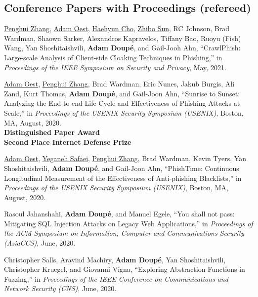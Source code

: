 \documentclass[11pt,letterpaper,sans]{moderncv}
\begin{document}
\subsection{Conference Papers with Proceedings (refereed)}

\begin{etaremune}

\item \underline{Penghui Zhang}, \underline{Adam Oest}, \underline{Haehyun Cho}, \underline{Zhibo Sun}, RC Johnson, Brad Wardman, Shaown Sarker, Alexandros Kapravelos, Tiffany Bao, Ruoyu (Fish) Wang, Yan Shoshitaishvili, \textbf{Adam Doup\'e}, and Gail-Jooh Ahn, ``CrawlPhish: Large-scale Analysis of Client-side Cloaking Techniques in Phishing,'' in \emph{Proceedings of the IEEE Symposium on Security and Privacy}, May, 2021.

\item \underline{Adam Oest}, \underline{Penghui Zhang}, Brad Wardman, Eric Nunes, Jakub Burgis, Ali Zand, Kurt Thomas, \textbf{Adam Doup\'e}, and Gail-Joon Ahn, ``Sunrise to Sunset: Analyzing the End-to-end Life Cycle and Effectiveness of Phishing Attacks at Scale,'' in \emph{Proceedings of the USENIX Security Symposium (USENIX)}, Boston, MA, August, 2020. \\
  \textbf{Distinguished Paper Award} \\
  \textbf{Second Place Internet Defense Prize}

\item \underline{Adam Oest}, \underline{Yeganeh Safaei}, \underline{Penghui Zhang}, Brad Wardman, Kevin Tyers, Yan Shoshitaishvili, \textbf{Adam Doup\'e}, and Gail-Joon Ahn, ``PhishTime: Continuous Longitudinal Measurement of the Effectiveness of Anti-phishing Blacklists,'' in \emph{Proceedings of the USENIX Security Symposium (USENIX)}, Boston, MA, August, 2020.

\item Rasoul Jahanshahi, \textbf{Adam Doup\'e}, and Manuel Egele, ``You shall not pass: Mitigating SQL Injection Attacks on Legacy Web Applications,'' in \emph{Proceedings of the ACM Symposium on Information, Computer and Communications Security (AsiaCCS)}, June, 2020.

\item Christopher Salls, Aravind Machiry, \textbf{Adam Doup\'e}, Yan Shoshitaishvili, Christopher Kruegel, and Giovanni Vigna, ``Exploring Abstraction Functions in Fuzzing,'' in \emph{Proceedings of the IEEE Conference on Communications and Network Security (CNS)}, June, 2020.  


\end{etaremune}
\end{document}
